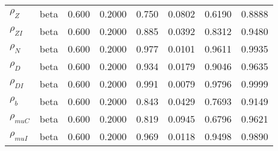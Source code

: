 \begin{center}
\begin{longtable}{llcccccc}
${\rho_Z}$ & beta &   0.600 & 0.2000 &   0.750& 0.0802 &  0.6190 &  0.8888 \\ 
${\rho_{ZI}}$ & beta &   0.600 & 0.2000 &   0.885& 0.0392 &  0.8312 &  0.9480 \\ 
${\rho_N}$ & beta &   0.600 & 0.2000 &   0.977& 0.0101 &  0.9611 &  0.9935 \\ 
${\rho_D}$ & beta &   0.600 & 0.2000 &   0.934& 0.0179 &  0.9046 &  0.9635 \\ 
${\rho_{DI}}$ & beta &   0.600 & 0.2000 &   0.991& 0.0079 &  0.9796 &  0.9999 \\ 
${\rho_b}$ & beta &   0.600 & 0.2000 &   0.843& 0.0429 &  0.7693 &  0.9149 \\ 
${\rho_{muC}}$ & beta &   0.600 & 0.2000 &   0.819& 0.0945 &  0.6796 &  0.9621 \\ 
${\rho_{muI}}$ & beta &   0.600 & 0.2000 &   0.969& 0.0118 &  0.9498 &  0.9890 \\ 
\end{longtable}
 \end{center}
